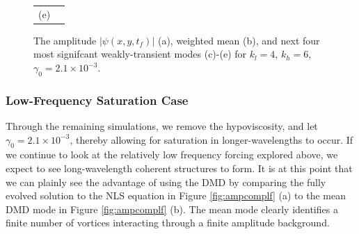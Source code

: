 \documentclass[aps,prl,preprint,groupedaddress]{revtex4-1}
\begin{document}
\begin{figure}[!ht]
\begin{tabular}{cc}
(e) & 
\end{tabular}
\caption{The amplitude $\left|\psi(x,y,t_{f})\right|$ (a), weighted mean (b), and next four most signifcant weakly-transient modes (c)-(e) for $k_{l}=4$, $k_{h}=6$, $\gamma_{0}=2.1\times 10^{-3}$. }
\label{fig:ampcompwwt}
\end{figure}

\subsubsection*{Low-Frequency Saturation Case}
Through the remaining simulations, we remove the hypoviscosity, and let $\gamma_{0}=2.1\times 10^{-3}$, thereby allowing for saturation in longer-wavelengths to occur.  If we continue to look at the relatively low frequency forcing explored above, we expect to see long-wavelength coherent structures to form.  It is at this point that we can plainly see the advantage of using the DMD by comparing the fully evolved solution to the NLS equation in Figure \ref{fig:ampcomplf} (a) to the mean DMD mode in Figure \ref{fig:ampcomplf} (b).  The mean mode clearly identifies a finite number of vortices interacting through a finite amplitude background.  
\end{document}
